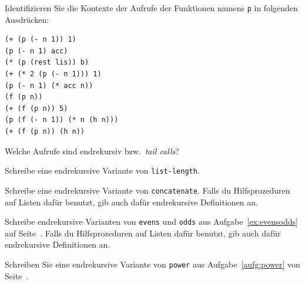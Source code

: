 \begin{aufgabe}
  Identifizieren Sie die Kontexte der Aufrufe der Funktionen namens
  \texttt{p} in folgenden Ausdrücken:
  
\begin{verbatim}
(+ (p (- n 1)) 1)
(p (- n 1) acc)
(* (p (rest lis)) b)
(+ (* 2 (p (- n 1))) 1)
(p (- n 1) (* acc n))
(f (p n))
(+ (f (p n)) 5)
(p (f (- n 1)) (* n (h n))) 
(+ (f (p n)) (h n))
\end{verbatim}
  Welche Aufrufe sind endrekursiv bzw.\ \textit{tail calls}?
\end{aufgabe}

\begin{aufgabe}
  Schreibe eine endrekursive Variante von \texttt{list-length}.
\end{aufgabe}

\begin{aufgabe}
  Schreibe eine endrekursive Variante von
  \texttt{concatenate}.  Falls du Hilfsprozeduren auf
  Listen dafür benutzt, gib auch dafür endrekursive Definitionen an.
\end{aufgabe}

\begin{aufgabe}
  Schreibe endrekursive Varianten von \texttt{evens} und \texttt{odds}
  aus Aufgabe~\ref{ex:evensodds} auf Seite~\pageref{ex:evensodds}.
  Falls du Hilfsprozeduren auf Listen dafür benutzt, gib auch dafür
  endrekursive Definitionen an.
\end{aufgabe}

\begin{aufgabe}
  Schreiben Sie eine endrekursive Variante von \texttt{power} aus
  Aufgabe~\ref{aufg:power} von Seite~\pageref{aufg:power}.
\end{aufgabe}


